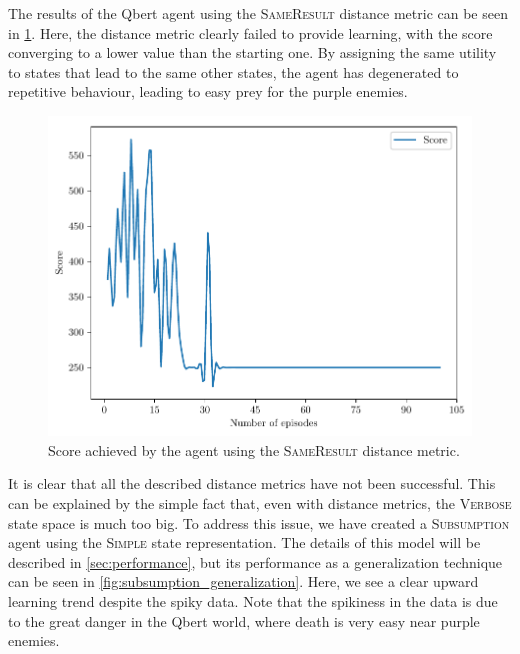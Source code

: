 \documentclass[a4paper,titlepage]{article}
\begin{document}
	The results of the Qbert agent using the \textsc{SameResult} distance metric can be seen in \cref{fig:same_result}. Here, the distance metric clearly failed to provide learning, with the score converging to a lower value than the starting one. By assigning the same utility to states that lead to the same other states, the agent has degenerated to repetitive behaviour, leading to easy prey for the purple enemies.

	\begin{figure}[!htb]
		\centering
		\includegraphics[width=\columnwidth]{plots/same_result.pdf}
		\caption
		{Score achieved by the agent using the \textsc{SameResult} distance metric.}
		\label{fig:same_result}
	\end{figure}

	It is clear that all the described distance metrics have not been successful. This can be explained by the simple fact that, even with distance metrics, the \textsc{Verbose} state space is much too big. To address this issue, we have created a \textsc{Subsumption} agent using the \textsc{Simple} state representation. The details of this model will be described in \cref{sec:performance}, but its performance as a generalization technique can be seen in \cref{fig:subsumption_generalization}. Here, we see a clear upward learning trend despite the spiky data. Note that the spikiness in the data is due to the great danger in the Qbert world, where death is very easy near purple enemies.
\end{document}
